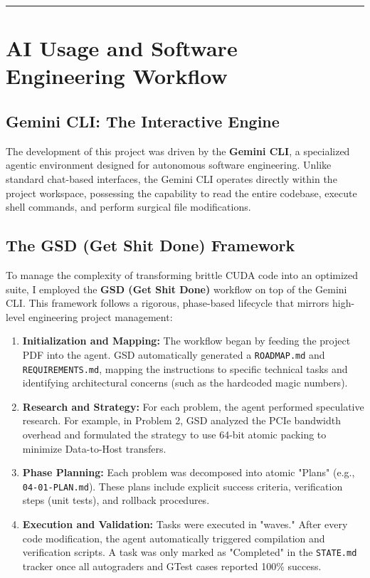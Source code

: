 \documentclass[11pt]{article}
\begin{document}
\noindent\rule{\textwidth}{0.4pt}

\section*{\color{white}AI Usage and Software Engineering Workflow}

\subsection*{Gemini CLI: The Interactive Engine}
The development of this project was driven by the \textbf{Gemini CLI}, a specialized agentic environment designed for autonomous software engineering. Unlike standard chat-based interfaces, the Gemini CLI operates directly within the project workspace, possessing the capability to read the entire codebase, execute shell commands, and perform surgical file modifications.

\subsection*{The GSD (Get Shit Done) Framework}
To manage the complexity of transforming brittle CUDA code into an optimized suite, I employed the \textbf{GSD (Get Shit Done)} workflow on top of the Gemini CLI. This framework follows a rigorous, phase-based lifecycle that mirrors high-level engineering project management:

\begin{enumerate}[label=\alph*.]
    \item \textbf{Initialization and Mapping:} The workflow began by feeding the project PDF into the agent. GSD automatically generated a \texttt{ROADMAP.md} and \texttt{REQUIREMENTS.md}, mapping the instructions to specific technical tasks and identifying architectural concerns (such as the hardcoded magic numbers).
    \item \textbf{Research and Strategy:} For each problem, the agent performed speculative research. For example, in Problem 2, GSD analyzed the PCIe bandwidth overhead and formulated the strategy to use 64-bit atomic packing to minimize Data-to-Host transfers.
    \item \textbf{Phase Planning:} Each problem was decomposed into atomic "Plans" (e.g., \texttt{04-01-PLAN.md}). These plans include explicit success criteria, verification steps (unit tests), and rollback procedures.
    \item \textbf{Execution and Validation:} Tasks were executed in "waves." After every code modification, the agent automatically triggered compilation and verification scripts. A task was only marked as "Completed" in the \texttt{STATE.md} tracker once all autograders and GTest cases reported 100\% success.
\end{enumerate}
\end{document}
